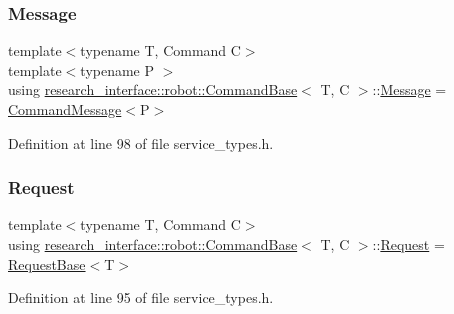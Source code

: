 \subsubsection{\texorpdfstring{Message}{Message}}
{\footnotesize\ttfamily template$<$typename T, Command C$>$ \\
template$<$typename P $>$ \\
using \hyperlink{structresearch__interface_1_1robot_1_1CommandBase}{research\+\_\+interface\+::robot\+::\+Command\+Base}$<$ T, C $>$\+::\hyperlink{structresearch__interface_1_1robot_1_1CommandBase_a969e615ce65a1309081591db384095d7}{Message} =  \hyperlink{structresearch__interface_1_1robot_1_1CommandMessage}{Command\+Message}$<$P$>$}



Definition at line 98 of file service\+\_\+types.\+h.

\mbox{\label{structresearch__interface_1_1robot_1_1CommandBase_ac557e2cbde0100f01c0eab817254c009}} 
\subsubsection{\texorpdfstring{Request}{Request}}
{\footnotesize\ttfamily template$<$typename T, Command C$>$ \\
using \hyperlink{structresearch__interface_1_1robot_1_1CommandBase}{research\+\_\+interface\+::robot\+::\+Command\+Base}$<$ T, C $>$\+::\hyperlink{structresearch__interface_1_1robot_1_1CommandBase_ac557e2cbde0100f01c0eab817254c009}{Request} =  \hyperlink{structresearch__interface_1_1robot_1_1RequestBase}{Request\+Base}$<$T$>$}



Definition at line 95 of file service\+\_\+types.\+h.

\mbox{\label{structresearch__interface_1_1robot_1_1CommandBase_ae8b503e2bc7d72e70b6eb08421e0d853}} 
